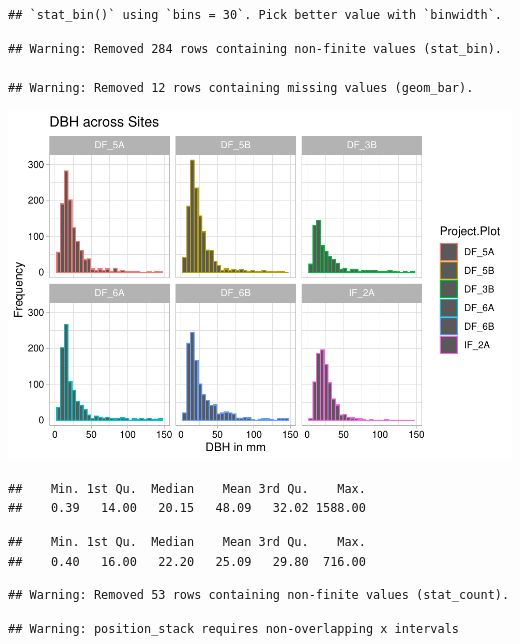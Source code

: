 \documentclass[
  12pt,
]{article}
\begin{document}
\begin{verbatim}
## `stat_bin()` using `bins = 30`. Pick better value with `binwidth`.
\end{verbatim}

\begin{verbatim}
## Warning: Removed 284 rows containing non-finite values (stat_bin).

## Warning: Removed 12 rows containing missing values (geom_bar).
\end{verbatim}

\includegraphics{GoldenGriffithsKnierMalinowski_ENV872_Project_files/figure-latex/DBH graphs-9.pdf}

\begin{verbatim}
##    Min. 1st Qu.  Median    Mean 3rd Qu.    Max. 
##    0.39   14.00   20.15   48.09   32.02 1588.00
\end{verbatim}

\begin{verbatim}
##    Min. 1st Qu.  Median    Mean 3rd Qu.    Max. 
##    0.40   16.00   22.20   25.09   29.80  716.00
\end{verbatim}

\begin{verbatim}
## Warning: Removed 53 rows containing non-finite values (stat_count).
\end{verbatim}

\begin{verbatim}
## Warning: position_stack requires non-overlapping x intervals
\end{verbatim}
\end{document}
